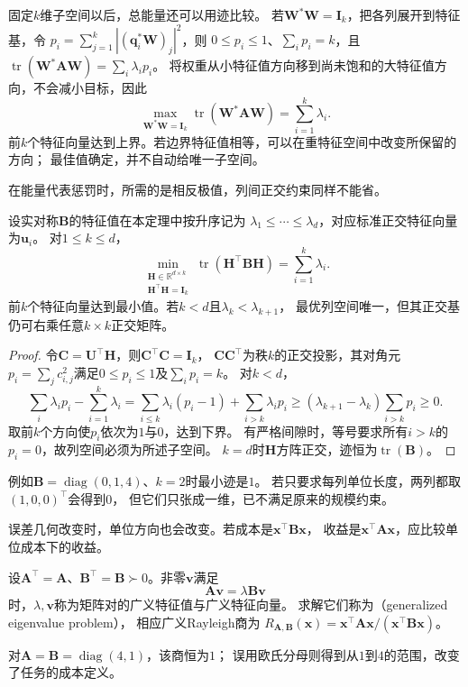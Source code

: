 固定$k$维子空间以后，总能量还可以用迹比较。
若$\bm W^*\bm W=\bm I_k$，把各列展开到特征基，令
$p_i=\sum_{j=1}^k|(\bm q_i^*\bm W)_j|^2$，则
$0\leq p_i\leq1$、$\sum_i p_i=k$，且
$\operatorname{tr}(\bm W^*\bm A\bm W)=\sum_i\lambda_i p_i$。
将权重从小特征值方向移到尚未饱和的大特征值方向，不会减小目标，因此
\[
 \max_{\bm W^*\bm W=\bm I_k}\operatorname{tr}(\bm W^*\bm A\bm W)
 =\sum_{i=1}^k\lambda_i.
\]
前$k$个特征向量达到上界。若边界特征值相等，可以在重特征空间中改变所保留的方向；
最佳值确定，并不自动给唯一子空间。

在能量代表惩罚时，所需的是相反极值，列间正交约束同样不能省。
\begin{theorem}[正交列约束下的迹最小化]
\label{thm:matrix-analysis-trace-minimum}
设实对称$\bm B$的特征值在本定理中按升序记为
$\lambda_1\leq\cdots\leq\lambda_d$，对应标准正交特征向量为$\bm u_i$。
对$1\leq k\leq d$，
\begin{equation}
 \min_{\substack{\bm H\in\mathbb R^{d\times k}\\\bm H^\top\bm H=\bm I_k}}
 \operatorname{tr}(\bm H^\top\bm B\bm H)=\sum_{i=1}^k\lambda_i.
 \label{eq:matrix-analysis-trace-minimum}
\end{equation}
前$k$个特征向量达到最小值。若$k<d$且$\lambda_k<\lambda_{k+1}$，
最优列空间唯一，但其正交基仍可右乘任意$k\times k$正交矩阵。
\end{theorem}
\begin{proof}
令$\bm C=\bm U^\top\bm H$，则$\bm C^\top\bm C=\bm I_k$，
$\bm C\bm C^\top$为秩$k$的正交投影，其对角元
$p_i=\sum_j c_{i,j}^2$满足$0\leq p_i\leq1$及$\sum_i p_i=k$。
对$k<d$，
\[
 \sum_i\lambda_i p_i-\sum_{i=1}^k\lambda_i
 =\sum_{i\leq k}\lambda_i(p_i-1)+\sum_{i>k}\lambda_i p_i
 \geq(\lambda_{k+1}-\lambda_k)\sum_{i>k}p_i\geq0.
\]
取前$k$个方向使$p_i$依次为$1$与$0$，达到下界。
有严格间隙时，等号要求所有$i>k$的$p_i=0$，故列空间必须为所述子空间。
$k=d$时$\bm H$方阵正交，迹恒为$\operatorname{tr}(\bm B)$。
\end{proof}
例如$\bm B=\operatorname{diag}(0,1,4)$、$k=2$时最小迹是$1$。
若只要求每列单位长度，两列都取$(1,0,0)^\top$会得到$0$，
但它们只张成一维，已不满足原来的规模约束。

误差几何改变时，单位方向也会改变。若成本是$\bm x^\top\bm B\bm x$，
收益是$\bm x^\top\bm A\bm x$，应比较单位成本下的收益。
\begin{definition}[对称正定矩阵对的广义特征值]
\label{def:matrix-analysis-generalized-eigenvalue}
设$\bm A^\top=\bm A$、$\bm B^\top=\bm B\succ0$。非零$\bm v$满足
\begin{equation}
 \bm A\bm v=\lambda\bm B\bm v
 \label{eq:matrix-analysis-generalized-eigenproblem}
\end{equation}
时，$\lambda,\bm v$称为矩阵对的广义特征值与广义特征向量。
求解它们称为（generalized eigenvalue problem），
相应广义Rayleigh商为
$R_{\bm A,\bm B}(\bm x)=\bm x^\top\bm A\bm x/(\bm x^\top\bm B\bm x)$。
\end{definition}
对$\bm A=\bm B=\operatorname{diag}(4,1)$，该商恒为$1$；
误用欧氏分母则得到从$1$到$4$的范围，改变了任务的成本定义。

